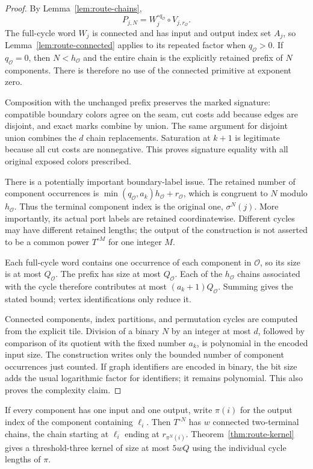 \begin{proof}
By Lemma~\ref{lem:route-chains},
\[
 P_{j,N}=W_j^{\circ q_{\mathcal O}}\circ V_{j,r_{\mathcal O}}.
\]
The full-cycle word $W_j$ is connected and has input and output index set
$A_j$, so Lemma~\ref{lem:route-connected} applies to its repeated factor when
$q_{\mathcal O}>0$.  If $q_{\mathcal O}=0$, then $N<h_{\mathcal O}$ and the
entire chain is the explicitly retained prefix of $N$ components.  There is
therefore no use of the connected primitive at exponent zero.

Composition with the unchanged prefix preserves the marked signature:
compatible boundary colors agree on the seam, cut costs add because edges
are disjoint, and exact marks combine by union.  The same argument for
disjoint union combines the $d$ chain replacements.  Saturation at $k+1$ is
legitimate because all cut costs are nonnegative.  This proves signature
equality with all original exposed colors prescribed.

There is a potentially important boundary-label issue.  The retained number
of component occurrences is
$\min(q_{\mathcal O},a_k)h_{\mathcal O}+r_{\mathcal O}$, which is congruent
to $N$ modulo $h_{\mathcal O}$.  Thus the terminal component index is the
original one, $\sigma^N(j)$.  More importantly, its actual port labels are
retained coordinatewise.  Different cycles may have different retained
lengths; the output of the construction is not asserted to be a common
power $T^{\circ M}$ for one integer $M$.

Each full-cycle word contains one occurrence of each component in
$\mathcal O$, so its size is at most $Q_{\mathcal O}$.  The prefix has size
at most $Q_{\mathcal O}$.  Each of the $h_{\mathcal O}$ chains associated
with the cycle therefore contributes at most $(a_k+1)Q_{\mathcal O}$.
Summing gives the stated bound; vertex identifications only reduce it.

Connected components, index partitions, and permutation cycles are computed
from the explicit tile.  Division of a binary $N$ by an integer at most $d$,
followed by comparison of its quotient with the fixed number $a_k$, is
polynomial in the encoded input size.  The construction writes only the
bounded number of component occurrences just counted.  If graph identifiers
are encoded in binary, the bit size adds the usual logarithmic factor for
identifiers; it remains polynomial.  This also proves the complexity claim.
\end{proof}

\begin{corollary}
If every component has one input and one output, write $\pi(i)$ for the
output index of the component containing $\ell_i$.  Then $T^{\circ N}$ has
$w$ connected two-terminal chains, the chain starting at $\ell_i$ ending at
$r_{\pi^N(i)}$.  Theorem~\ref{thm:route-kernel} gives a threshold-three
kernel of size at most $5wQ$ using the individual cycle lengths of $\pi$.
\end{corollary}

